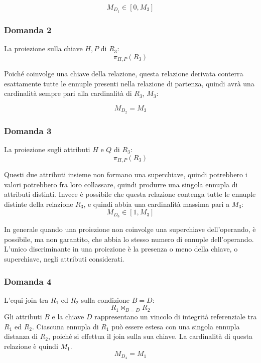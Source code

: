 \documentclass{article}
\numberwithin{equation}{subsection}
\begin{document}
\begin{equation}
    M_{D_1}\in[0,M_3]
\end{equation}

\subsubsection*{Domanda 2}

La proiezione sulla chiave $H,P$ di $R_3$:
\begin{equation*}
    \pi_{H,P}(R_3)
\end{equation*}

Poiché coinvolge una chiave della relazione, questa relazione derivata conterra esattamente tutte le ennuple presenti nella relazione di partenza, quindi avrà una cardinalità sempre pari 
alla cardinalità di $R_3$, $M_3$: 

\begin{equation}
    M_{D_2}=M_3
\end{equation}

\subsubsection*{Domanda 3}

La proiezione sugli attributi $H$ e $Q$ di $R_3$:
\begin{equation*}
    \pi_{H,P}(R_3)
\end{equation*}

Questi due attributi insieme non formano una superchiave, quindi potrebbero i valori potrebbero fra loro collassare, quindi produrre una singola ennupla di attributi distinti. Invece è 
possibile che questa relazione contenga tutte le ennuple distinte della relazione $R_3$, e quindi abbia una cardinalità massima pari a $M_3$:
\begin{equation}
    M_{D_3}\in[1,M_3]
\end{equation}

In generale quando una proiezione non coinvolge una superchiave dell'operando, è possibile, ma non garantito, che abbia lo stesso numero di ennuple dell'operando. L'unico discriminante in una proiezione è la presenza 
o meno della chiave, o superchiave, negli attributi considerati. 

\subsubsection*{Domanda 4}

L'equi-join tra $R_1$ ed $R_2$ sulla condizione $B=D$:
\begin{equation*}
    R_1\Join_{B=D}R_2
\end{equation*}
Gli attributi $B$ e la chiave $D$ rappresentano un vincolo di integrità referenziale tra $R_1$ ed $R_2$. Ciascuna ennupla di $R_1$ può essere estesa con una singola ennupla distanza di $R_2$, 
poiché si effettua il join sulla sua chiave. La cardinalità di questa relazione è quindi $M_1$.  
\begin{equation}
    M_{D_4}=M_1
\end{equation}
\end{document}
